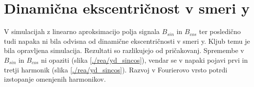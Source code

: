 \section{Dinamična ekscentričnost v smeri y}
V simulacijah z linearno aproksimacijo polja signala $B_{sin}$ in $B_{cos}$ ter posledično tudi napaka ni bila odvisna od dinamične ekscentričnosti v smeri y. Kljub temu je bila opravljena simulacija. Rezultati so razlikujejo od pričakovanj. Spremembe v $B_{sin}$ in $B_{cos}$ ni opaziti (slika \ref{./rea/yd_sincos}), vendar se v napaki  pojavi prvi in tretji harmonik (slika \ref{./rea/yd_sincos}). Razvoj v Fourierovo vrsto potrdi izstopanje omenjenih harmonikov.
\newpage
